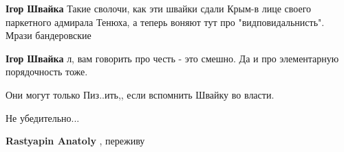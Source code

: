 \begin{itemize}
\begin{itemize}
 
\textbf{Ігор Швайка} Такие сволочи, как эти швайки сдали Крым-в лице своего
паркетного адмирала Тенюха, а теперь воняют тут про "видповидальнисть". Мрази
бандеровские

 
\textbf{Ігор Швайка} л, вам говорить про честь - это смешно. Да и про элементарную порядочность тоже.

 
Они могут только Пиз..ить,, если вспомнить Швайку во власти.

\end{itemize}

 
Не убедительно...

\begin{itemize}
 
\textbf{Rastyapin Anatoly} , переживу
\end{itemize}

 

\end{itemize}
